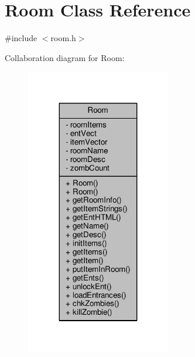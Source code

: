 \hypertarget{class_room}{}\section{Room Class Reference}
\label{class_room}


{\ttfamily \#include $<$room.\+h$>$}



Collaboration diagram for Room\+:
\nopagebreak
\begin{figure}[H]
\begin{center}
\leavevmode
\includegraphics[width=179pt]{class_room__coll__graph}
\end{center}
\end{figure}
